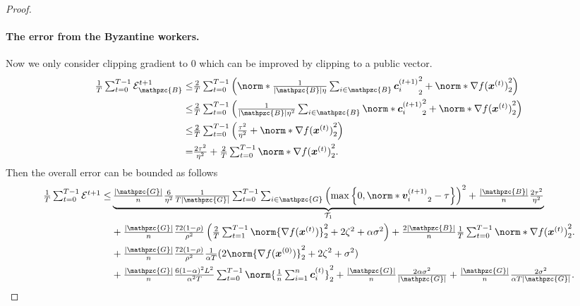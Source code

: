 \documentclass{article}
\newcommand{\gset}{\ensuremath{{\mathpzc{G}}}}
\newcommand{\bset}{\ensuremath{{\mathpzc{B}}}}
\begin{document}
\begin{proof}
  \paragraph{The error from the Byzantine workers.}  Now we only consider clipping gradient to 0 which can be improved by clipping to a public vector.
  \begin{align*}
    \tfrac{1}{T}\tsum_{t=0}^{T-1} \cE_{\bset}^{t+1}
    \le & \tfrac{2}{T}\tsum_{t=0}^{T-1} \left(
    \norm*{ \tfrac{1}{|\bset|\eta} \tsum_{i\in\bset} \cc_i^{(t+1)} }_2^2 + \norm*{ \nabla f(\xx^{(t)}) }_2^2
    \right)                                                                                              \\
    \le & \tfrac{2}{T}\tsum_{t=0}^{T-1} \left(\tfrac{1}{|\bset|\eta^2} \tsum_{i\in\bset}
    \norm*{ \cc_i^{(t+1)} }_2^2 + \norm*{ \nabla f(\xx^{(t)}) }_2^2
    \right)                                                                                              \\
    \le & \tfrac{2}{T}\tsum_{t=0}^{T-1} \left(\tfrac{\tau^2}{\eta^2} + \norm*{ \nabla f(\xx^{(t)}) }_2^2
    \right)                                                                                              \\
    =   & \tfrac{2\tau^2}{\eta^2} +  \tfrac{2}{T}\tsum_{t=0}^{T-1} \norm*{ \nabla f(\xx^{(t)}) }_2^2.
  \end{align*}
  Then the overall error can be bounded as follows
  \begin{align*}
    \tfrac{1}{T}\tsum_{t=0}^{T-1} \cE^{t+1}
    \le &
    \underbrace{
      \tfrac{|\gset|}{n} \tfrac{6}{\eta^2}\tfrac{1}{T|\gset|}\tsum_{t=0}^{T-1}\tsum_{i\in\gset} \left(\max\left\{0, \norm*{\vv_i^{(t+1)}}_2-\tau\right\}\right)^2 + \tfrac{|\bset|}{n} \tfrac{ 2 \tau^2 }{\eta^2}
    }_{\cT_1}
    \\
        & +
    \tfrac{|\gset|}{n} \tfrac{72(1-\rho)}{\rho^2} \left(\tfrac{2}{T}\tsum_{t=1}^{T-1} \norm{\nabla f(\xx^{(t)}) }_2^2
    +  2  \zeta^2
    + \alpha\sigma^2 \right)
    + \tfrac{2|\bset|}{n}\tfrac{1}{T}\tsum_{t=0}^{T-1} \norm*{ \nabla f(\xx^{(t)}) }_2^2.                      \\
        & + \tfrac{|\gset|}{n} \tfrac{72(1-\rho)}{\rho^2} \tfrac{1}{\alpha T}(2\norm{\nabla f(\xx^{(0)}) }_2^2
    + 2 \zeta^2 + \sigma^2)                                                                                    \\
        & + \tfrac{|\gset|}{n} \tfrac{6(1-\alpha)^2L^2}{\alpha^2T} \tsum_{t=0}^{T-1}
    \norm{ \tfrac{1}{n} \tsum_{i=1}^n \cc_i^{(t)} }_2^2
    + \tfrac{|\gset|}{n} \tfrac{2\alpha\sigma^2}{|\gset|} + \tfrac{|\gset|}{n} \tfrac{2\sigma^2}{ \alpha  T|\gset|}.
  \end{align*}


\end{proof}
\end{document}
